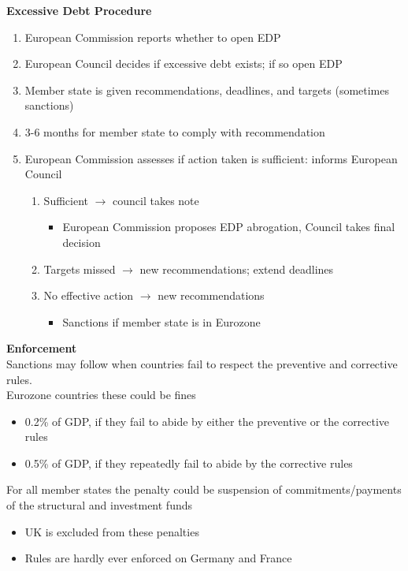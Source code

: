 \documentclass{beamer}
\begin{document}
\begin{frame}
  \textbf{Excessive Debt Procedure}
  \begin{enumerate}
    \item European Commission reports whether to open EDP
    \item European Council decides if excessive debt exists; if so open EDP
    \item Member state is given recommendations, deadlines, and targets (sometimes sanctions)
    \item 3-6 months for member state to comply with recommendation
    \item European Commission assesses if action taken is sufficient: informs European Council
    \begin{enumerate}[i]
      \item Sufficient $\rightarrow$ council takes note
      \begin{itemize}
        \item European Commission proposes EDP abrogation, Council takes final decision
      \end{itemize}
      \item Targets missed $\rightarrow$ new recommendations; extend deadlines
      \item No effective action $\rightarrow$ new recommendations
      \begin{itemize}
        \item Sanctions if member state is in Eurozone
      \end{itemize}
    \end{enumerate}
  \end{enumerate}
\end{frame}


\begin{frame}
  \textbf{Enforcement}\\
   Sanctions may follow when countries fail to respect the preventive and corrective rules.\\
   Eurozone countries these could be fines
    \begin{itemize}
      \item 0.2\% of GDP, if they fail to abide by either the preventive or the corrective rules
      \item 0.5\% of GDP, if they repeatedly fail to abide by the corrective rules
    \end{itemize}
    \medskip
    For all member states the penalty could be suspension of commitments/payments of the structural and investment funds
    \begin{itemize}
      \item UK is excluded from these penalties
      \item Rules are hardly ever enforced on Germany and France
    \end{itemize}    
\end{frame}
\end{document}
